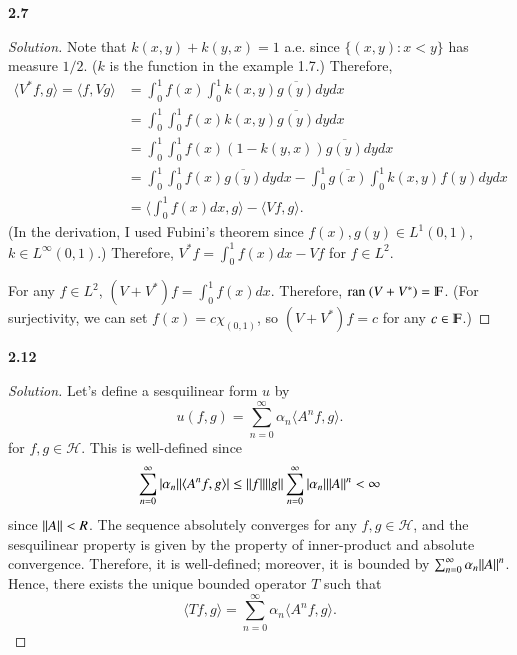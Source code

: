 \documentclass[a4paper, 12pt]{article}
\newcommand{\ran}{\textrm{ran }}
\theoremstyle{Mydefinition}
\theoremstyle{Mytheorem}
\begin{document}
\noindent \textbf{2.7}

\begin{proof}[Solution]

Note that $k(x,y)+k(y,x) = 1$ a.e. since $\{(x,y):x<y\}$ has measure $1/2$. ($k$ is the function in the example 1.7.) Therefore,
\begin{equation}
\begin{split}
    \langle V^*f, g \rangle = \langle f, Vg \rangle &= \int_0^1 f(x)\int_0^1 k(x,y)\overline{g(y)} dy dx\\
    &=\int_0^1 \int_0^1 f(x)k(x,y)\overline{g(y)} dy dx \\
    &= \int_0^1 \int_0^1 f(x)(1-k(y,x))\overline{g(y)} dy dx \\
    &= \int_0^1 \int_0^1 f(x)\overline{g(y)} dy dx - \int_0^1 \overline{g(x)}\int_0^1 k(x,y)f(y) dy dx \\
    &= \langle \int_0^1 f(x) dx, g\rangle - \langle Vf, g\rangle.
\end{split}
\end{equation}
(In the derivation, I used Fubini's theorem since $f(x),g(y)\in L^1(0,1)$, $k\in L^\infty(0,1)$.) Therefore, $V^* f = \int_0^1 f(x)dx - Vf$ for $f\in L^2$.

For any $f\in L^2$, $(V+V^*)f = \int_0^1 f(x) dx$. Therefore, $\ran (V+V^*) = \varmathbb{F}$. (For surjectivity, we can set $f(x) = c\chi_{(0,1)}$, so $(V+V^*)f = c$ for any $c\in \varmathbb{F}$.)
\end{proof}

\noindent \textbf{2.12}

\begin{proof}[Solution]
Let's define a sesquilinear form $u$ by
\begin{equation}
    u(f,g) = \sum_{n=0}^\infty \alpha_n \langle A^n f, g\rangle.
\end{equation}
for $f,g\in \mathscr{H}$. This is well-defined since
\begin{equation}
    \sum_{n=0}^\infty \abs{\alpha_n} \abs{\langle A^n f, g\rangle}\leq  \norm{f}\norm{g}\sum_{n=0}^\infty \abs{\alpha_n} \norm{A}^n<\infty
\end{equation}
since $\norm{A}<R$. The sequence absolutely converges for any $f,g\in \mathscr{H}$, and the sesquilinear property is given by the property of inner-product and absolute convergence. Therefore, it is well-defined; moreover, it is bounded by $\sum_{n=0}^\infty \alpha_n \norm{A}^n$. Hence, there exists the unique bounded operator $T$ such that
\begin{equation}
    \langle Tf, g\rangle = \sum_{n=0}^\infty \alpha_n \langle A^n f, g\rangle.
\end{equation}
\end{proof}
\end{document}
